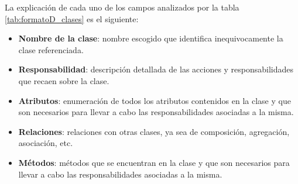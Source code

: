 \par La explicación de cada uno de los campos analizados por la tabla \ref{tab:formatoD_clases} es el siguiente:
\begin{itemize}
  \item \textbf{Nombre de la clase}: nombre escogido que identifica inequivocamente la clase referenciada.
  \item \textbf{Responsabilidad}: descripción detallada de las acciones y responsabilidades que recaen sobre la clase.
  \item \textbf{Atributos}: enumeración de todos los atributos contenidos en la clase y que son necesarios para llevar a cabo las responsabilidades asociadas a la misma.
  \item \textbf{Relaciones}: relaciones con otras clases, ya sea de composición, agregación, asociación, etc.
  \item \textbf{Métodos}: métodos que se encuentran en la clase y que son necesarios para llevar a cabo las responsabilidades asociadas a la misma.
\end{itemize}









